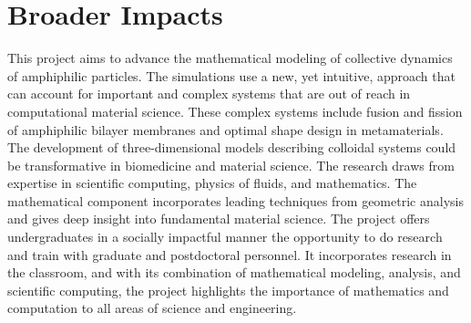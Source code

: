 \documentclass{article}
\begin{document}
\section*{Broader Impacts}
This project aims to advance the mathematical modeling of collective 
dynamics of amphiphilic particles. The simulations use a new, yet intuitive,
approach that can account for important and complex systems that are out of 
reach in computational material science. These complex systems include 
fusion and fission of amphiphilic bilayer membranes and optimal shape design
in metamaterials. The development of three-dimensional 
models describing colloidal systems could be transformative in biomedicine
and material science. The research draws from expertise in scientific 
computing, physics of fluids, and mathematics. The mathematical component 
incorporates leading techniques from geometric analysis and gives deep insight 
into fundamental material science. The project offers undergraduates 
in a socially impactful manner the opportunity to do research and train 
with graduate and postdoctoral personnel. It incorporates research in the 
classroom, and with its combination of mathematical modeling, analysis, 
and scientific computing, the project highlights the importance of 
mathematics and computation to all areas of science and engineering.
\end{document}
